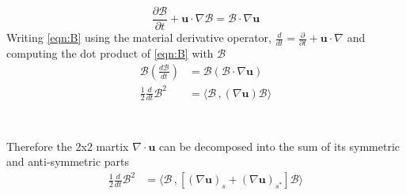 \begin{equation}
  \label{eqn:B}
   \frac{\partial \mathcal{B}}{\partial t}  + \mathbf{u} \cdot \nabla \mathcal{B} = \mathcal{B} \cdot \nabla \mathbf{u}
\end{equation}
Writing \ref{eqn:B} using the material derivative operator, $\frac{d}{dt} = \frac{\partial}{\partial t} + \mathbf{u} \cdot \nabla $ and computing the dot product of \ref{eqn:B} with $\mathcal{B}$
\begin{align*}
  \mathcal{B}\left( \frac{d \mathcal{B}}{dt} \right) &= \mathcal{B} \left( \mathcal{B} \cdot \nabla \mathbf{u} \right)   \\
  \frac{1}{2}\frac{d}{dt}\mathcal{B}^2  &= \langle \mathcal{B}\,,  \left( \nabla \mathbf{u} \right) \mathcal{B}\rangle   \\
\end{align*}
\\
\\
Therefore the 2x2 martix $\nabla \cdot \mathbf{u}$ can be decomposed into the sum of its symmetric and anti-symmetric parts
\begin{align*}
  \frac{1}{2}\frac{d}{dt}\mathcal{B}^2  &= \langle \mathcal{B}\,,  \left[ \left(\nabla \mathbf{u}\right)_{s} + \left(\nabla \mathbf{u}\right)_{s^{*}} \right] \mathcal{B}\rangle   \\
\end{align*}

